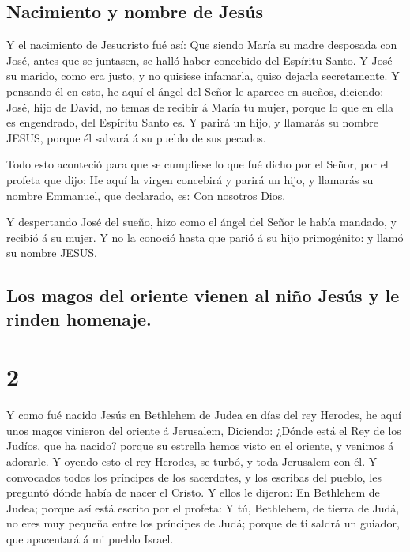 \hypertarget{nacimiento-y-nombre-de-jesuxfas}{%
\subsection{Nacimiento y nombre de
Jesús}\label{nacimiento-y-nombre-de-jesuxfas}}

 Y el nacimiento de Jesucristo fué así: Que siendo María su
madre desposada con José, antes que se juntasen, se halló haber
concebido del Espíritu Santo.  Y José su marido, como era
justo, y no quisiese infamarla, quiso dejarla secretamente.
 Y pensando él en esto, he aquí el ángel del Señor le
aparece en sueños, diciendo: José, hijo de David, no temas de recibir á
María tu mujer, porque lo que en ella es engendrado, del Espíritu Santo
es.  Y parirá un hijo, y llamarás su nombre JESUS, porque
él salvará á su pueblo de sus pecados.

 Todo esto aconteció para que se cumpliese lo que fué dicho
por el Señor, por el profeta que dijo:  He aquí la virgen
concebirá y parirá un hijo, y llamarás su nombre Emmanuel, que
declarado, es: Con nosotros Dios.

 Y despertando José del sueño, hizo como el ángel del Señor
le había mandado, y recibió á su mujer.  Y no la conoció
hasta que parió á su hijo primogénito: y llamó su nombre JESUS.

\hypertarget{los-magos-del-oriente-vienen-al-niuxf1o-jesuxfas-y-le-rinden-homenaje.}{%
\subsection{Los magos del oriente vienen al niño Jesús y le rinden
homenaje.}\label{los-magos-del-oriente-vienen-al-niuxf1o-jesuxfas-y-le-rinden-homenaje.}}

\hypertarget{section-1}{%
\section{2}\label{section-1}}

 Y como fué nacido Jesús en Bethlehem de Judea en días del
rey Herodes, he aquí unos magos vinieron del oriente á Jerusalem,
 Diciendo: ¿Dónde está el Rey de los Judíos, que ha nacido?
porque su estrella hemos visto en el oriente, y venimos á adorarle.
 Y oyendo esto el rey Herodes, se turbó, y toda Jerusalem
con él.  Y convocados todos los príncipes de los sacerdotes,
y los escribas del pueblo, les preguntó dónde había de nacer el Cristo.
 Y ellos le dijeron: En Bethlehem de Judea; porque así está
escrito por el profeta:  Y tú, Bethlehem, de tierra de Judá,
no eres muy pequeña entre los príncipes de Judá; porque de ti saldrá un
guiador, que apacentará á mi pueblo Israel.

